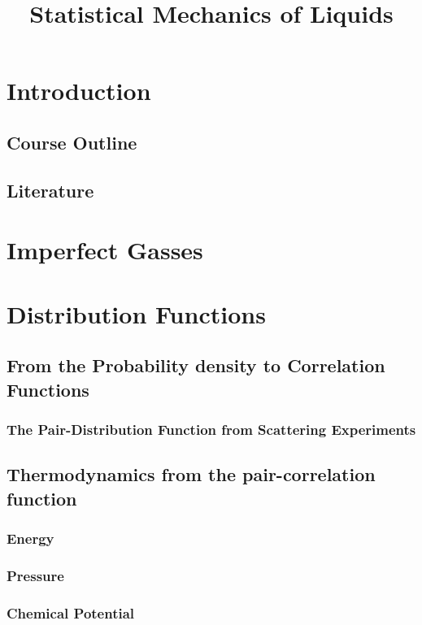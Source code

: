 \documentclass[a4paper,11pt]{article}
\title{Statistical Mechanics of Liquids}
\begin{document}
 

\maketitle
\flushbottom

\newpage
\section{Introduction}
\subsection{Course Outline}
\subsection{Literature}

\newpage

\section{Imperfect Gasses}\label{sec:imperfect}

\section{Distribution Functions}\label{sec:distribution}
\subsection{From the Probability density to Correlation Functions}

\subsubsection{The Pair-Distribution Function from Scattering Experiments}
\subsection{Thermodynamics from the pair-correlation function}
\subsubsection{Energy}
\subsubsection{Pressure}
\subsubsection{Chemical Potential}
\end{document}
